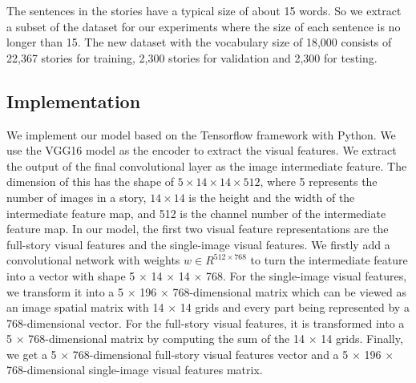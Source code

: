 \documentclass[a4paper,fleqn]{cas-sc}
\begin{document}
The sentences in the stories have a typical size of about 15 words. So we extract a subset of the dataset for our experiments where the size of each sentence is no longer than 15. The new dataset with the vocabulary size of 18,000 consists of 22,367 stories for training, 2,300 stories for validation and 2,300 for testing. 

\subsection{ Implementation} We implement our model based on the Tensorflow framework with Python. We use the VGG16 model as the encoder to extract the visual features. We extract the output of the final convolutional layer as the image intermediate feature. The dimension of this has the shape of $5 \times 14 \times 14 \times 512$, where 5 represents the number of images in a story, $14 \times 14$ is the height and the width of the intermediate feature map, and 512 is the channel number of the intermediate feature map. In our model, the first two visual feature representations are  the full-story visual features  and  the single-image visual features. We firstly add a convolutional network with  weights $w \in R^{512\times768}$ to turn the intermediate feature into a vector with  shape  5 $\times$ 14 $\times$ 14 $\times$ 768. For the single-image visual features, we transform it into a 5 $\times$ 196 $\times$ 768-dimensional matrix which can be viewed as an image spatial matrix with 14 $\times$ 14 grids and every part being represented by a 768-dimensional vector. For the full-story visual features, it is transformed into a 5 $\times$ 768-dimensional matrix by computing the sum of the 14 $\times$ 14 grids. Finally, we get a 5 $\times$ 768-dimensional full-story visual features vector and a 5 $\times$ 196 $\times$ 768-dimensional single-image visual features matrix. 
\end{document}
